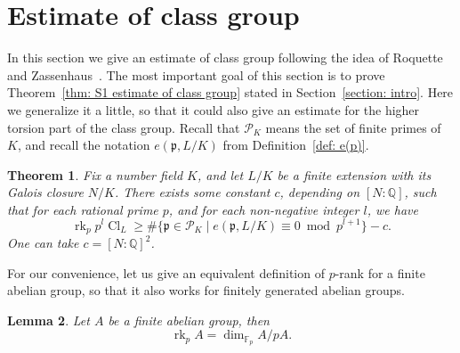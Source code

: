 \documentclass{amsart}
\numberwithin{equation}{section}
\theoremstyle{plain}
\newtheorem{theorem}{Theorem}[section]
\newtheorem{lemma}[theorem]{Lemma}
\theoremstyle{definition}
\theoremstyle{remark}
\begin{document}
\section{Estimate of class group}\label{section: estimate of class group}
In this section we give an estimate of class group following the idea of Roquette and Zassenhaus~\cite{RZ1969ClassRank}.
The most important goal of this section is to prove Theorem~\ref{thm: S1 estimate of class group} stated in Section~\ref{section: intro}.
Here we generalize it a little, so that it could also give an estimate for the higher torsion part of the class group.
Recall that $\mathcal{P}_K$ means the set of finite primes of $K$, and recall the notation $e(\mathfrak{p},L/K)$ from Definition~\ref{def: e(p)}.
\begin{theorem}\label{thm: estimate of class group}
    Fix a number field $K$, and let $L/K$ be a finite extension with its Galois closure $N/K$.
    There exists some constant $c$, depending on $[N:\mathbb{Q}]$, such that for each rational prime $p$, and for each non-negative integer $l$, we have 
	\begin{equation*}
		\operatorname{rk}_p p^{l}\operatorname{Cl}_L\geq\#\{\mathfrak{p}\in\mathcal{P}_K\mid e(\mathfrak{p},L/K)\equiv0\bmod{p^{l+1}}\}-c.	
	\end{equation*}
    One can take $c=[N:\mathbb{Q}]^2$.
\end{theorem}
For our convenience, let us give an equivalent definition of $p$-rank for a finite abelian group, so that it also works for finitely generated abelian groups.
\begin{lemma}
	Let $A$ be a finite abelian group, then
	\begin{equation*}
		\operatorname{rk}_pA=\dim_{\mathbb{F}_p}A/pA.
	\end{equation*}
\end{lemma}
\end{document}
